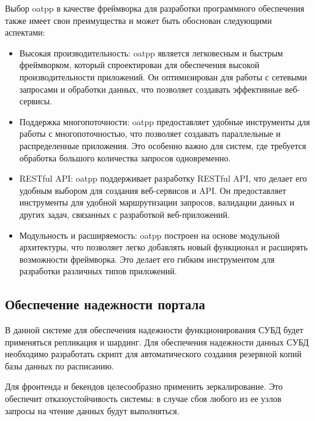 Выбор oatpp в качестве фреймворка для разработки программного обеспечения также имеет свои преимущества и может быть обоснован следующими аспектами:
\begin{itemize}
    \item Высокая производительность: oatpp является легковесным и быстрым фреймворком, который спроектирован для обеспечения высокой производительности приложений. Он оптимизирован для работы с сетевыми запросами и обработки данных, что позволяет создавать эффективные веб-сервисы.
    \item Поддержка многопоточности: oatpp предоставляет удобные инструменты для работы с многопоточностью, что позволяет создавать параллельные и распределенные приложения. Это особенно важно для систем, где требуется обработка большого количества запросов одновременно.
    \item RESTful API: oatpp поддерживает разработку RESTful API, что делает его удобным выбором для создания веб-сервисов и API. Он предоставляет инструменты для удобной маршрутизации запросов, валидации данных и других задач, связанных с разработкой веб-приложений.
    \item Модульность и расширяемость: oatpp построен на основе модульной архитектуры, что позволяет легко добавлять новый функционал и расширять возможности фреймворка. Это делает его гибким инструментом для разработки различных типов приложений.
\end{itemize} 



\subsection*{Обеспечение надежности портала}

В данной системе для обеспечения надежности функционирования СУБД будет применяться репликация и шардинг. Для обеспечения надежности данных СУБД необходимо разработать скрипт для автоматического создания резервной копий базы данных по расписанию.

Для фронтенда и бекендов целесообразно применить зеркалирование. Это обеспечит отказоустойчивость системы: в случае сбоя любого из ее узлов запросы на чтение данных будут выполняться. 